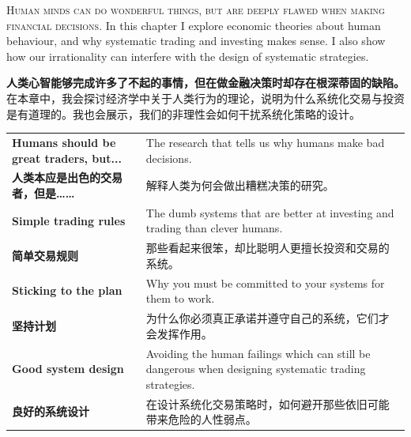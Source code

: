 
\begin{englishblock} \noindent\textsc{Human minds can do wonderful things, but are deeply flawed when making financial decisions.} In this chapter I explore economic theories about human behaviour, and why systematic trading and investing makes sense. I also show how our irrationality can interfere with the design of systematic strategies. \end{englishblock}

\begin{chineseblock} \noindent\textbf{人类心智能够完成许多了不起的事情，但在做金融决策时却存在根深蒂固的缺陷。} 在本章中，我会探讨经济学中关于人类行为的理论，说明为什么系统化交易与投资是有道理的。我也会展示，我们的非理性会如何干扰系统化策略的设计。\end{chineseblock}


\begin{bilingualtableblock} \begin{tabularx}{\textwidth}{@{} L{0.3\textwidth} Y@{}}\textbf{Humans should be great traders, but...} & The research that tells us why humans make bad decisions. \\

\textbf{人类本应是出色的交易者，但是……} & 解释人类为何会做出糟糕决策的研究。 \\
\textbf{Simple trading rules} & The dumb systems that are better at investing and trading than clever humans. \\
\textbf{简单交易规则} & 那些看起来很笨，却比聪明人更擅长投资和交易的系统。 \\
\textbf{Sticking to the plan} & Why you must be committed to your systems for them to work. \\
\textbf{坚持计划} & 为什么你必须真正承诺并遵守自己的系统，它们才会发挥作用。 \\
\textbf{Good system design} & Avoiding the human failings which can still be dangerous when designing systematic trading strategies. \\
\textbf{良好的系统设计} & 在设计系统化交易策略时，如何避开那些依旧可能带来危险的人性弱点。 \\
\end{tabularx}
\end{bilingualtableblock}



